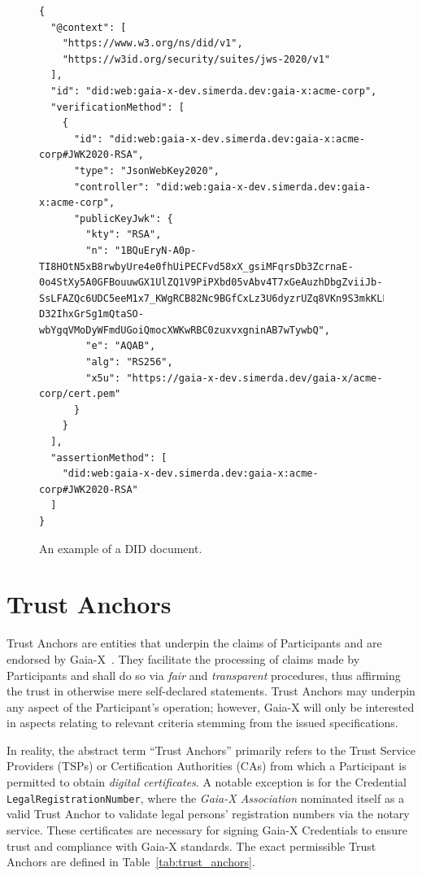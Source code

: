 \begin{figure}
    \centering
    \begin{verbatim}
{
  "@context": [
    "https://www.w3.org/ns/did/v1",
    "https://w3id.org/security/suites/jws-2020/v1"
  ],
  "id": "did:web:gaia-x-dev.simerda.dev:gaia-x:acme-corp",
  "verificationMethod": [
    {
      "id": "did:web:gaia-x-dev.simerda.dev:gaia-x:acme-corp#JWK2020-RSA",
      "type": "JsonWebKey2020",
      "controller": "did:web:gaia-x-dev.simerda.dev:gaia-x:acme-corp",
      "publicKeyJwk": {
        "kty": "RSA",
        "n": "1BQuEryN-A0p-TI8HOtN5xB8rwbyUre4e0fhUiPECFvd58xX_gsiMFqrsDb3ZcrnaE-0o4StXy5A0GFBouuwGX1UlZQ1V9PiPXbd05vAbv4T7xGeAuzhDbgZviiJb-SsLFAZQc6UDC5eeM1x7_KWgRCB82Nc9BGfCxLz3U6dyzrUZq8VKn9S3mkKLLuslewa00X8TCHEAVQFEktVV9F617GXEknrEZhKoZfPeuiweMj4FxuamBRQPaZlCWQduiDnVkmNu4pr7C7HJQkBxxH-D32IhxGrSg1mQtaSO-wbYgqVMoDyWFmdUGoiQmocXWKwRBC0zuxvxgninAB7wTywbQ",
        "e": "AQAB",
        "alg": "RS256",
        "x5u": "https://gaia-x-dev.simerda.dev/gaia-x/acme-corp/cert.pem"
      }
    }
  ],
  "assertionMethod": [
    "did:web:gaia-x-dev.simerda.dev:gaia-x:acme-corp#JWK2020-RSA"
  ]
}
    \end{verbatim}
    \caption{An example of a DID document.}\label{fig:did_document}
\end{figure}

\section{Trust Anchors}\label{sec:trust-anchors}

Trust Anchors are entities that underpin the claims of Participants and are endorsed by Gaia-X~\cite{gaiax_trust_framework}.
They facilitate the processing of claims made by Participants and shall do so via \textit{fair} and \textit{transparent} procedures, thus affirming the trust in otherwise mere self-declared statements.
Trust Anchors may underpin any aspect of the Participant's operation; however, Gaia-X will only be interested in aspects relating to relevant criteria stemming from the issued specifications.

In reality, the abstract term ``Trust Anchors'' primarily refers to the Trust Service Providers (TSPs) or Certification Authorities (CAs) from which a Participant is permitted to obtain \textit{digital certificates}.
A notable exception is for the Credential \texttt{LegalRegistrationNumber}, where the \textit{Gaia-X Association} nominated itself as a valid Trust Anchor to validate legal persons' registration numbers via the notary service.
These certificates are necessary for signing Gaia-X Credentials to ensure trust and compliance with Gaia-X standards.
The exact permissible Trust Anchors are defined in Table~\ref{tab:trust_anchors}.

